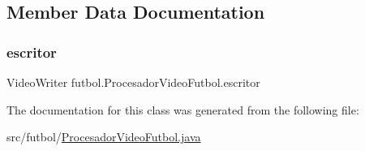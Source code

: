 \subsection{Member Data Documentation}
\hypertarget{classfutbol_1_1_procesador_video_futbol_a418840b4a45fbf94684ddb8f295cad70}{}\label{classfutbol_1_1_procesador_video_futbol_a418840b4a45fbf94684ddb8f295cad70} 
\subsubsection{\texorpdfstring{escritor}{escritor}}
{\footnotesize\ttfamily Video\+Writer futbol.\+Procesador\+Video\+Futbol.\+escritor\hspace{0.3cm}{\ttfamily [private]}}



The documentation for this class was generated from the following file\+:\begin{DoxyCompactItemize}
\item 
src/futbol/\hyperlink{_procesador_video_futbol_8java}{Procesador\+Video\+Futbol.\+java}\end{DoxyCompactItemize}
